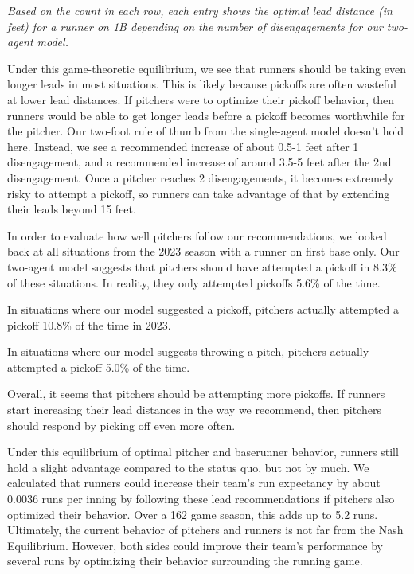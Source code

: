 \documentclass{article}
\begin{document}
      \begin{table}
        \centering
        
        \caption{
          \it Based on the count in each row, each entry shows the optimal lead distance (in feet) for a runner on 1B depending on the number of disengagements for our two-agent model.
        }
        \label{tab:count-twoagent}
      \end{table}

      Under this game-theoretic equilibrium, we see that runners should be taking even longer leads in most situations. This is likely because pickoffs are often wasteful at lower lead distances. If pitchers were to optimize their pickoff behavior, then runners would be able to get longer leads before a pickoff becomes worthwhile for the pitcher. Our two-foot rule of thumb from the single-agent model doesn't hold here. Instead, we see a recommended increase of about 0.5-1 feet after 1 disengagement, and a recommended increase of around 3.5-5 feet after the 2nd disengagement. Once a pitcher reaches 2 disengagements, it becomes extremely risky to attempt a pickoff, so runners can take advantage of that by extending their leads beyond 15 feet.

      In order to evaluate how well pitchers follow our recommendations, we looked back at all situations from the 2023 season with a runner on first base only. Our two-agent model suggests that pitchers should have attempted a pickoff in 8.3\% of these situations. In reality, they only attempted pickoffs 5.6\% of the time.

      In situations where our model suggested a pickoff, pitchers actually attempted a pickoff 10.8\% of the time in 2023.

      In situations where our model suggests throwing a pitch, pitchers actually attempted a pickoff 5.0\% of the time.

      Overall, it seems that pitchers should be attempting more pickoffs. If runners start increasing their lead distances in the way we recommend, then pitchers should respond by picking off even more often.

      Under this equilibrium of optimal pitcher and baserunner behavior, runners still hold a slight advantage compared to the status quo, but not by much. We calculated that runners could increase their team's run expectancy by about 0.0036 runs per inning by following these lead recommendations if pitchers also optimized their behavior. Over a 162 game season, this adds up to 5.2 runs. Ultimately, the current behavior of pitchers and runners is not far from the Nash Equilibrium. However, both sides could improve their team's performance by several runs by optimizing their behavior surrounding the running game.
\end{document}
